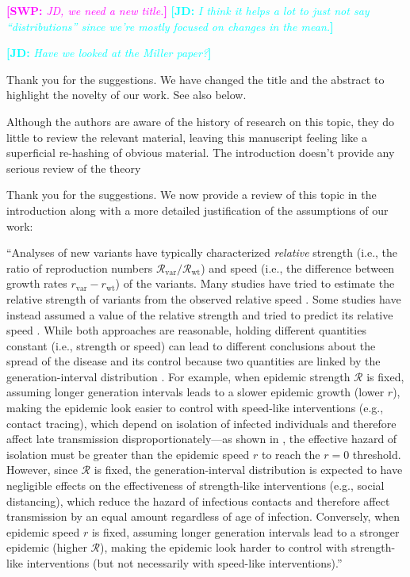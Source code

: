 \documentclass[12pt]{article}
\newcommand{\vvvar}{\mathrm{var}}
\newcommand{\wwwt}{\mathrm{wt}}
\newcommand{\rx}[1]{\ensuremath{{r}_{#1}}\xspace}
\newcommand{\rw}{\rx{\wwwt}}
\newcommand{\rv}{\rx{\vvvar}}
\newcommand{\Rx}[1]{\ensuremath{{\mathcal R}_{#1}}\xspace}
\newcommand{\RR}{\ensuremath{{\mathcal R}}\xspace}
\newcommand{\Rw}{\Rx{\wwwt}}
\newcommand{\Rv}{\Rx{\vvvar}}
\newcommand{\revtext}{\textsf}
\newcommand{\comment}[3]{\textcolor{#1}{\textbf{[#2: }\textsl{#3}\textbf{]}}}
\newcommand{\jd}[1]{\comment{cyan}{JD}{#1}}
\newcommand{\swp}[1]{\comment{magenta}{SWP}{#1}}
\begin{document}
\swp{JD, we need a new title.} \jd{I think it helps a lot to just not say ``distributions'' since we're mostly focused on changes in the mean.}

\jd{Have we looked at the Miller paper?}

Thank you for the suggestions. We have changed the title and the abstract to highlight the novelty of our work. See also below.

\revtext{Although the authors are aware of the history of research on this topic, they do little to review the relevant material, leaving this manuscript feeling like a superficial re-hashing of obvious material.  The introduction doesn't provide any serious review of the theory}

Thank you for the suggestions. We now provide a review of this topic in the introduction along with a more detailed justification of the assumptions of our work:

``Analyses of new variants have typically characterized \emph{relative} strength (i.e., the ratio of reproduction numbers $\Rv/\Rw$) and speed (i.e., the difference between growth rates $\rv-\rw$) of the variants.
Many studies have tried to estimate the relative strength of variants from the observed relative speed \citep{davies2021estimated, leung2021early, volz2021transmission,zhao2021,campbell2021increased}.
Some studies have instead assumed a value of the relative strength and tried to predict its relative speed \citep{davies2021estimated,di2021impact}.
While both approaches are reasonable, holding different quantities constant (i.e., strength or speed) can lead to different conclusions about the spread of the disease and its control because two quantities are linked by the generation-interval distribution \citep{doi:10.1098/rspb.2020.1556}.
For example, when epidemic strength $\RR$ is fixed, assuming longer generation intervals leads to a slower epidemic growth (lower $r$), making the epidemic look easier to control with speed-like interventions (e.g., contact tracing), which depend on isolation of infected individuals and therefore affect late transmission disproportionately---as shown in \cite{doi:10.1098/rspb.2020.1556}, the effective hazard of isolation must be greater than the epidemic speed $r$ to reach the $r=0$ threshold.
However, since $\RR$ is fixed, the generation-interval distribution is expected to have negligible effects on the effectiveness of strength-like interventions (e.g., social distancing), which reduce the hazard of infectious contacts and therefore affect transmission by an equal amount regardless of age of infection.
Conversely, when epidemic speed $r$ is fixed, assuming longer generation intervals lead to a stronger epidemic (higher $\RR$), making the epidemic look harder to control with strength-like interventions (but not necessarily with speed-like interventions).''
\end{document}
